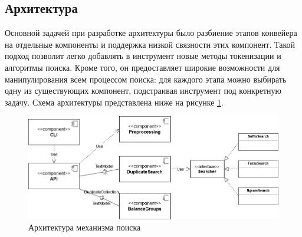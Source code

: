 \documentclass[14pt]{matmex-diploma-custom}
\begin{document}
\subsection{Архитектура}

Основной задачей при разработке архитектуры было разбиение этапов конвейера на отдельные компоненты и поддержка низкой связности этих компонент. Такой подход позволит легко добавлять в инструмент новые методы токенизации и алгоритмы поиска. Кроме того, он предоставляет широкие возможности для манипулирования всем процессом поиска: для каждого этапа можно выбирать одну из существующих компонент, подстраивая инструмент под конкретную задачу. Схема архитектуры представлена ниже на рисунке \ref{fig:Architecture}.

\begin{figure}[h!]
	\includegraphics[scale=0.5]{pictures/Architecture.png}
	\centering
	\caption{Архитектура механизма поиска}
	\label{fig:Architecture}
\end{figure}





\end{document}
